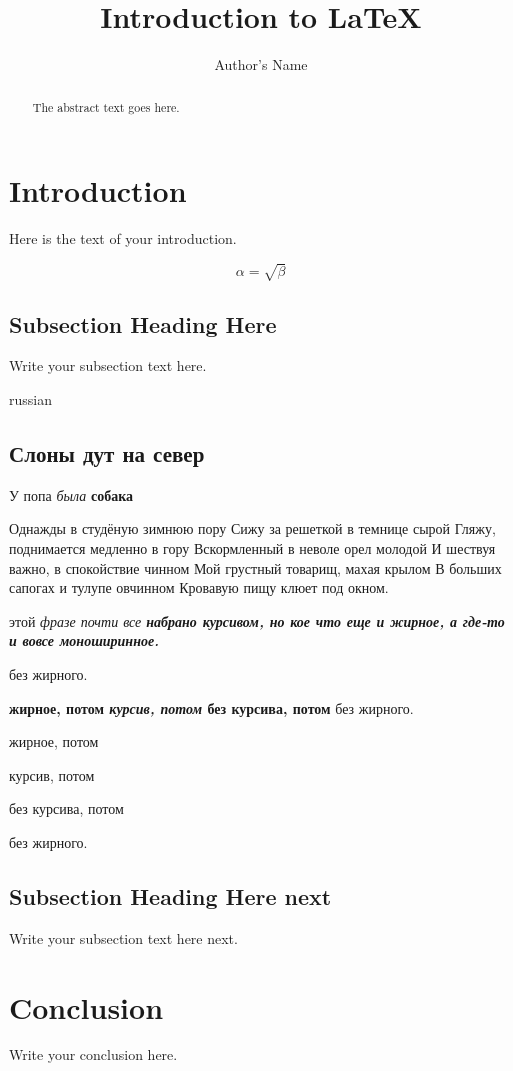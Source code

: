 \documentclass[oneside,final,14pt]{article}
\begin{document}
\title{Introduction to \LaTeX{}}
\author{Author's Name}

\maketitle

\begin{abstract}
The abstract text goes here.
\end{abstract}

\section{Introduction}
Here is the text of your introduction.

\begin{equation}
    \label{simple_equation}
    \alpha = \sqrt{ \beta }
\end{equation}

\subsection{Subsection Heading Here}
Write your subsection text here.

\begin{otherlanguage*}{russian}
\subsection{Слоны дут на север}
У попа {\it была} {\bf собака}

Однажды в студёную зимнюю пору
Сижу за решеткой в темнице сырой
Гляжу, поднимается медленно в гору
Вскормленный в неволе орел молодой
И шествуя важно, в спокойствие чинном
Мой грустный товарищ, махая крылом
В больших сапогах и тулупе овчинном
Кровавую пищу клюет под окном.

 этой \itshape фразе почти все \bfseries 
набрано курсивом, \ttfamily но кое что
\upshape еще и жирное, \rmfamily а где-то
и вовсе \mdseries моноширинное.

 без жирного.

 \textbf{жирное, потом \textit{курсив, потом} без курсива, потом} без жирного.

 \begin{bfseries} жирное, потом 
        \begin{itshape} курсив, потом
        \end{itshape}без курсива, потом
        \end{bfseries} без жирного.


\end{otherlanguage*}

\subsection{Subsection Heading Here next}
Write your subsection text here next.

\section{Conclusion}
Write your conclusion here.
\end{document}
